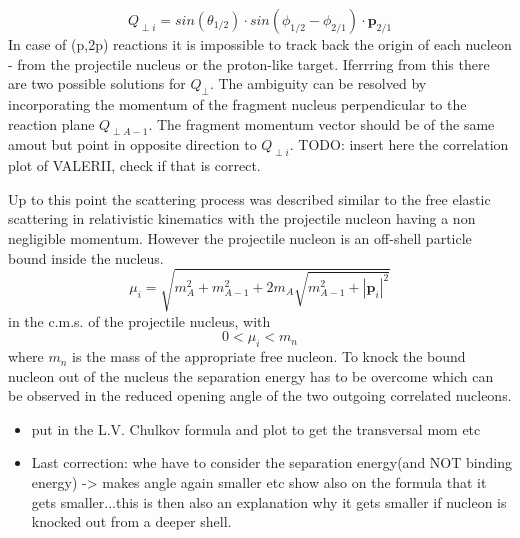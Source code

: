\begin{equation}\label{eq:chulkov}
Q_{\perp i} = sin(\theta_{1/2})\cdot sin(\phi_{1/2} -\phi_{2/1})\cdot\mathbf{p}_{2/1}
\end{equation}
In case of (p,2p) reactions it is impossible to track back the origin of each nucleon - from the projectile nucleus or the proton-like target. Iferrring from this there are two possible solutions for $Q_{\perp}$. The ambiguity can be resolved by incorporating the momentum of the fragment nucleus perpendicular to the reaction plane $Q_{\perp A-1}$. The fragment momentum vector should be of the same amout but point in opposite direction to $Q_{\perp i}$.
TODO: insert here the correlation plot of VALERII, check if that is correct.


Up to this point the scattering process was described similar to the free elastic scattering in relativistic kinematics with the projectile nucleon having a non negligible momentum. However the projectile nucleon is an off-shell particle  bound inside the nucleus. 
\begin{equation}
\mu_i =  \sqrt{m_A^2 + m_{A-1}^2 + 2m_A\sqrt{m_{A-1}^2 + |\mathbf{p}_i|^2}}
\end{equation}
in the c.m.s. of the projectile nucleus, with
\begin{equation}
0 < \mu_i  < m_n
\end{equation}
where $m_n$ is the mass of the appropriate free nucleon.
To knock the bound nucleon out of the nucleus the separation energy has to be overcome which can be observed in the reduced opening angle of the two outgoing correlated nucleons.


\begin{itemize}
\item put in the L.V. Chulkov formula and plot to get the transversal mom etc
\item Last correction: whe have to consider the separation energy(and NOT binding energy) -> makes angle again smaller etc show also on the formula that it gets smaller...this is then also an explanation why it gets smaller if nucleon is knocked out from a deeper shell.
\end{itemize}



%

